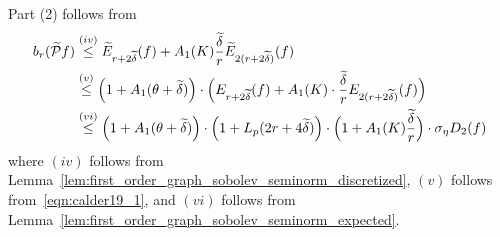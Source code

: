 \documentclass{article}
\newcommand{\1}{\mathbf{1}}
\newcommand{\mc}[1]{\mathcal{#1}}
\newcommand{\wt}[1]{\widetilde{#1}}
\theoremstyle{alden}
\theoremstyle{aldenthm}
\theoremstyle{definition}
\theoremstyle{remark}
\begin{document}
Part (2) follows from
\begin{align*}
b_r(\wt{\mc{P}}f) & \overset{(iv)}{\leq} \wt{E}_{r + 2\wt{\delta}}(f) + A_1(K)\frac{\wt{\delta}}{r}\wt{E}_{2(r + 2\wt{\delta})}(f)\\
& \overset{(v)}{\leq} \Bigl(1 + A_1(\theta + \wt{\delta})\Bigr) \cdot \Bigl({E}_{r + 2\wt{\delta}}(f) + A_1(K)\cdot\frac{\wt{\delta}}{r}{E}_{2(r + 2\wt{\delta})}(f)\Bigr) \\
& \overset{(vi)}{\leq} \Bigl(1 + A_1(\theta + \wt{\delta})\Bigr) \cdot \Bigl(1 + L_p(2r + 4\wt{\delta})\Bigr) \cdot \Bigl(1 + A_1(K)\frac{\wt{\delta}}{r}\Bigr) \cdot \sigma_{\eta} D_2(f)
\end{align*}
where $(iv)$ follows from Lemma~\ref{lem:first_order_graph_sobolev_seminorm_discretized}, $(v)$ follows from~\eqref{eqn:calder19_1}, and $(vi)$ follows from Lemma~\ref{lem:first_order_graph_sobolev_seminorm_expected}.
\end{document}

